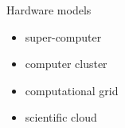 {
\begin{frame}


	\begin{columns}
	\begin{block}{Hardware models}
	\begin{overlayarea}{\textwidth}{4cm}
		\begin{itemize}
			\item<1->{super-computer}
			\item<2->{computer cluster}
			\item<3->{computational grid}
			\item<4->{scientific cloud}
		\end{itemize}
		\vspace{5cm}
	\end{overlayarea}
	\end{block}


\end{columns}
\end{frame}}
